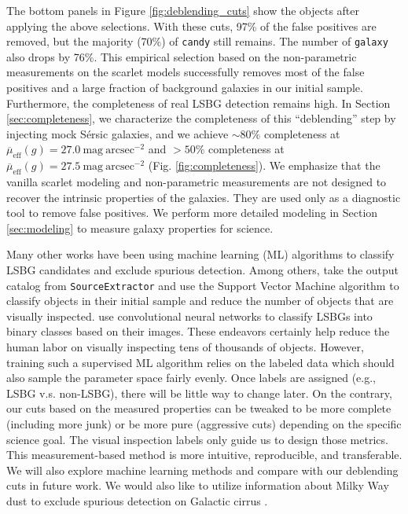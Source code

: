 \documentclass[twocolumn,astrosymb,twocolappendix]{aastex631}
\newcommand{\sbunit}{\mathrm{mag\ arcsec}^{-2}}
\newcommand{\sbeff}{\overline{\mu}_{\mathrm{eff}}(g)}
\newcommand{\code}[1]{\texttt{#1}}
\newcommand{\sersic}{S\'ersic}
\begin{document}
\begin{CJK*}{UTF8}{gbsn}
The bottom panels in Figure \ref{fig:deblending_cuts} show the objects after applying the above selections. With these cuts, 97\% of the false positives are removed, but the majority (70\%) of \code{candy} still remains. The number of \code{galaxy} also drops by 76\%. This empirical selection based on the non-parametric measurements on the scarlet models successfully removes most of the false positives and a large fraction of background galaxies in our initial sample. Furthermore, the completeness of real LSBG detection remains high. In Section \ref{sec:completeness}, we characterize the completeness of this ``deblending'' step by injecting mock \sersic{} galaxies, and we achieve $\sim80\%$ completeness at $\sbeff = 27.0\ \sbunit$ and $>50\%$ completeness at $\sbeff = 27.5\ \sbunit$ (Fig. \ref{fig:completeness}). We emphasize that the vanilla scarlet modeling and non-parametric measurements are not designed to recover the intrinsic properties of the galaxies. They are used only as a diagnostic tool to remove false positives. We perform more detailed modeling in Section \ref{sec:modeling} to measure galaxy properties for science. 


Many other works have been using machine learning (ML) algorithms to classify LSBG candidates and exclude spurious detection. Among others, \citet{Tanoglidis2021} take the output catalog from \code{SourceExtractor} and use the Support Vector Machine algorithm to classify objects in their initial sample and reduce the number of objects that are visually inspected. \citet{Zaritsky2019,Zaritsky2021,Zaritsky2022} use convolutional neural networks to classify LSBGs into binary classes based on their images. These endeavors certainly help reduce the human labor on visually inspecting tens of thousands of objects. However, training such a supervised ML algorithm relies on the labeled data which should also sample the parameter space fairly evenly. Once labels are assigned (e.g., LSBG v.s. non-LSBG), there will be little way to change later. On the contrary, our cuts based on the measured properties can be tweaked to be more complete (including more junk) or be more pure (aggressive cuts) depending on the specific science goal. The visual inspection labels only guide us to design those metrics. This measurement-based method is more intuitive, reproducible, and transferable. We will also explore machine learning methods and compare with our deblending cuts in future work. We would also like to utilize information about Milky Way dust to exclude spurious detection on Galactic cirrus \citep{Zaritsky2021,Zaritsky2022}.


\end{CJK*}
\end{document}
